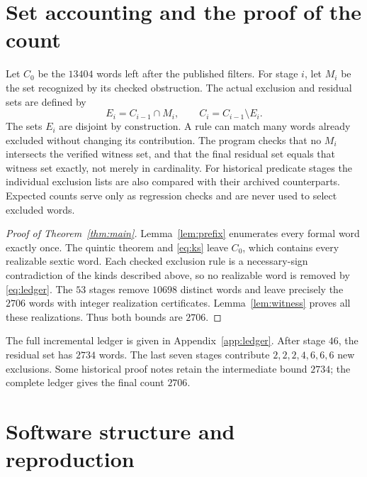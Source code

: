 \documentclass[11pt]{article}
\theoremstyle{definition}
\begin{document}
\section{Set accounting and the proof of the count}

Let $C_0$ be the $13404$ words left after the published filters. For
stage $i$, let $M_i$ be the set recognized by its checked obstruction.
The actual exclusion and residual sets are defined by
\begin{equation}\label{eq:ledger}
 E_i=C_{i-1}\cap M_i,\qquad C_i=C_{i-1}\setminus E_i.
\end{equation}
The sets $E_i$ are disjoint by construction. A rule can match many words
already excluded without changing its contribution. The program checks
that no $M_i$ intersects the verified witness set, and that the final
residual set equals that witness set exactly, not merely in cardinality.
For historical predicate stages the individual exclusion lists are also
compared with their archived counterparts. Expected counts serve only as
regression checks and are never used to select excluded words.

\begin{proof}[Proof of Theorem~\ref{thm:main}]
Lemma~\ref{lem:prefix} enumerates every formal word exactly once.
The quintic theorem and \eqref{eq:ks} leave $C_0$, which contains every
realizable sextic word. Each checked exclusion rule is a necessary-sign
contradiction of the kinds described above, so no realizable word is
removed by \eqref{eq:ledger}. The $53$ stages remove $10698$ distinct
words and leave precisely the $2706$ words with integer realization
certificates. Lemma~\ref{lem:witness} proves all these realizations.
Thus both bounds are $2706$.
\end{proof}

The full incremental ledger is given in Appendix~\ref{app:ledger}.
After stage $46$, the residual set has $2734$ words. The last seven
stages contribute $2,2,2,4,6,6,6$ new exclusions. Some historical proof
notes retain the intermediate bound $2734$; the complete ledger gives
the final count $2706$.

\section{Software structure and reproduction}
\end{document}
